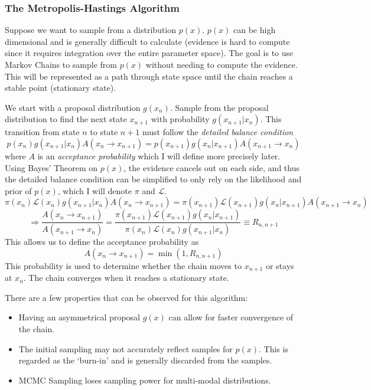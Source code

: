\subsubsection{The Metropolis-Hastings Algorithm}
Suppose we want to sample from a distribution $p(x)$. $p(x)$ can be high dimensional and is generally difficult to calculate (evidence is hard to compute since it requires integration over the entire parameter space). The goal is to use Markov Chains to sample from $p(x)$ without needing to compute the evidence. This will be represented as a path through state space until the chain reaches a stable point (stationary state).

We start with a proposal distribution $g(x_n)$. Sample from the proposal distribution to find the next state $x_{n+1}$ with probability $g(x_{n+1}|x_n)$. This transition from state $n$ to state $n+1$ must follow the \textit{detailed balance condition}
\[ p(x_n) g(x_{n+1}|x_n) A(x_n \rightarrow x_{n+1}) = p(x_{n+1}) g(x_n|x_{n+1}) A(x_{n+1} \rightarrow x_{n}) \]
where $A$ is an \textit{acceptance probability} which I will define more precisely later. Using Bayes' Theorem on $p(x)$, the evidence cancels out on each side, and thus the detailed balance condition can be simplified to only rely on the likelihood and prior of $p(x)$, which I will denote $\pi$ and $\mathcal{L}$.
\[ \pi(x_n)\mathcal{L}(x_n) g(x_{n+1}|x_n) A(x_n \rightarrow x_{n+1}) = \pi(x_{n+1}) \mathcal{L}(x_{n+1}) g(x_{n}|x_{n+1}) A(x_{n+1}\rightarrow x_{n}) \]
\[ \Rightarrow \frac{A(x_n \rightarrow x_{n+1})}{A(x_{n+1}\rightarrow x_{n})} = \frac{\pi(x_{n+1}) \mathcal{L}(x_{n+1}) g(x_{n}|x_{n+1})}{\pi(x_n)\mathcal{L}(x_n) g(x_{n+1}|x_n)} \equiv R_{n,n+1} \]
This allows us to define the acceptance probability as
\[ A(x_n \rightarrow x_{n+1}) = \min( 1, R_{n,n+1} ) \]
This probability is used to determine whether the chain moves to $x_{n+1}$ or stays at $x_n$. The chain converges when it reaches a stationary state.

There are a few properties that can be observed for this algorithm:
\begin{itemize}
    \item Having an asymmetrical proposal $g(x)$ can allow for faster convergence of the chain.
    \item The initial sampling may not accurately reflect samples for $p(x)$. This is regarded as the `burn-in' and is generally discarded from the samples.
    \item MCMC Sampling loses sampling power for multi-modal distributions. 
\end{itemize}


